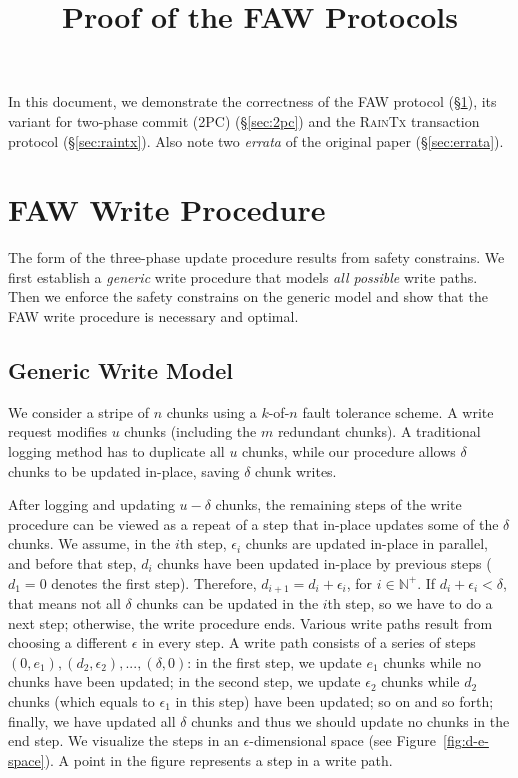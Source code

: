 \documentclass[letterpaper,10pt,twocolumn]{article}
\date{}
\def\protocol/{FAW}
\begin{document}
\title{Proof of the \protocol/ Protocols}

\maketitle

In this document, we demonstrate the correctness of the \protocol/ protocol (\S\ref{sec:faw}), its variant for two-phase commit (2PC) (\S\ref{sec:2pc}) and the \textsc{RainTx} transaction protocol (\S\ref{sec:raintx}).
Also note two \emph{errata} of the original paper (\S\ref{sec:errata}).

\section{\protocol/ Write Procedure}
\label{sec:faw}

The form of the three-phase update procedure results from safety constrains.
We first establish a \emph{generic} write procedure that models \emph{all possible} write paths.
Then we enforce the safety constrains on the generic model and show that the \protocol/ write procedure is necessary and optimal. 

\subsection{Generic Write Model}

We consider a stripe of $n$ chunks using a $k$-of-$n$ fault tolerance scheme.
A write request modifies $u$ chunks (including the $m$ redundant chunks).
A traditional logging method has to duplicate all $u$ chunks, while our procedure allows $\delta$ chunks to be updated in-place, saving $\delta$ chunk writes.

After logging and updating $u - \delta$ chunks, the remaining steps of the write procedure can be viewed as a repeat of a step that in-place updates some of the $\delta$ chunks.
We assume, in the $i$th step, $\epsilon_i$ chunks are updated in-place in parallel, and before that step, $d_i$ chunks have been updated in-place by previous steps ($d_1=0$ denotes the first step).
Therefore, $d_{i+1} = d_i + \epsilon_i$, for $i \in \mathbb{N}^{+}$. If $d_i + \epsilon_i < \delta$, that means not all $\delta$ chunks can be updated in the $i$th step, so we have to do a next step; otherwise, the write procedure ends.
Various write paths result from choosing a different $\epsilon$ in every step.
A write path consists of a series of steps $(0, e_1), (d_2, \epsilon_2), ..., (\delta, 0)$: in the first step, we update $e_1$ chunks while no chunks have been updated; in the second step, we update $\epsilon_2$ chunks while $d_2$ chunks (which equals to $\epsilon_1$ in this step) have been updated; so on and so forth; finally, we have updated all $\delta$ chunks and thus we should update no chunks in the end step.
We visualize the steps in an $\epsilon$-dimensional space (see Figure~\ref{fig:d-e-space}).
A point in the figure represents a step in a write path.
\end{document}
